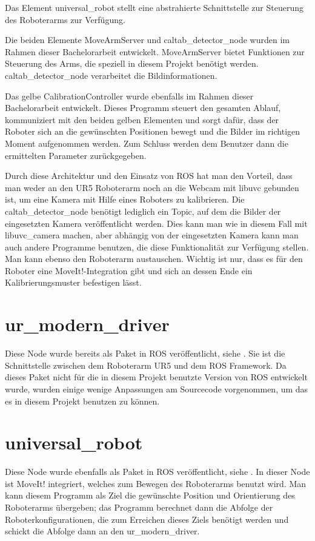 Das Element universal\_robot stellt eine abstrahierte Schnittstelle zur Steuerung des Roboterarms zur Verfügung.

Die beiden Elemente MoveArmServer und caltab\_detector\_node wurden im Rahmen dieser Bachelorarbeit entwickelt. MoveArmServer bietet Funktionen zur Steuerung des Arms, die speziell in diesem Projekt benötigt werden. caltab\_detector\_node verarbeitet die Bildinformationen.

Das gelbe CalibrationController wurde ebenfalls im Rahmen dieser Bachelorarbeit entwickelt. Dieses Programm steuert den gesamten Ablauf, kommuniziert mit den beiden gelben Elementen und sorgt dafür, dass der Roboter sich an die gewünschten Positionen bewegt und die Bilder im richtigen Moment aufgenommen werden. Zum Schluss werden dem Benutzer dann die ermittelten Parameter zurückgegeben.

Durch diese Architektur und den Einsatz von ROS hat man den Vorteil, dass man weder an den UR5 Roboterarm noch an die Webcam mit libuvc gebunden ist, um eine Kamera mit Hilfe eines Roboters zu kalibrieren. Die caltab\_detector\_node benötigt lediglich ein Topic, auf dem die Bilder der eingesetzten Kamera veröffentlicht werden. Dies kann man wie in diesem Fall mit libuvc\_camera machen, aber abhängig von der eingesetzten Kamera kann man auch andere Programme benutzen, die diese Funktionalität zur Verfügung stellen. Man kann ebenso den Roboterarm austauschen. Wichtig ist nur, dass es für den Roboter eine MoveIt!-Integration gibt und sich an dessen Ende ein Kalibrierungsmuster befestigen lässt. 

\section{ur\_modern\_driver} %
\label{sec:ur_modern_driver}
Diese Node wurde bereits als Paket in ROS veröffentlicht, siehe \cite{ur_modern_driver}. Sie ist die Schnittstelle zwischen dem Roboterarm UR5 und dem ROS Framework. Da dieses Paket nicht für die in diesem Projekt benutzte Version von ROS entwickelt wurde, wurden einige wenige Anpassungen am Sourcecode vorgenommen, um das es in diesem Projekt benutzen zu können.

\section{universal\_robot} %
\label{sec:universal_robot}
Diese Node wurde ebenfalls als Paket in ROS veröffentlicht, siehe \cite{universal_robot}. In dieser Node ist MoveIt! integriert, welches zum Bewegen des Roboterarms benutzt wird. Man kann diesem Programm als Ziel die gewünschte Position und Orientierung des Roboterarms übergeben; das Programm berechnet dann die Abfolge der Roboterkonfigurationen, die zum Erreichen dieses Ziels benötigt werden und schickt die Abfolge dann an den ur\_modern\_driver. 

